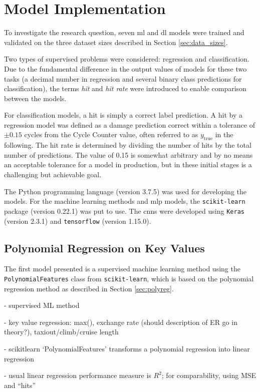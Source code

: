 \section{Model Implementation} \label{sec:practical}
To investigate the research question, seven \ac{ml} and \ac{dl} models were trained and validated on the three dataset sizes described in Section \ref{sec:data_sizes}.

Two types of supervised problems were considered: regression and classification. Due to the fundamental difference in the output values of models for these two tasks (a decimal number in regression and several binary class predictions for classification), the terms \textit{hit} and \textit{hit rate} were introduced to enable comparison between the models.

For classification models, a hit is simply a correct label prediction. A hit by a regression model was defined as a damage prediction correct within a tolerance of \(\pm0.15\) cycles from the Cycle Counter value, often referred to as \(y_\text{true}\) in the following. The hit rate is determined by dividing the number of hits by the total number of predictions. The value of 0.15 is somewhat arbitrary and by no means an acceptable tolerance for a model in production, but in these initial stages is a challenging but achievable goal.

The Python programming language (version 3.7.5) was used for developing the models. For the machine learning methods and \ac{mlp} models, the \texttt{scikit-learn} package (version 0.22.1) was put to use. The \ac{cnn}s were developed using \texttt{Keras} (version 2.3.1) and \texttt{tensorflow} (version 1.15.0).

\subsection{Polynomial Regression on Key Values}
The first model presented is a supervised machine learning method using the \texttt{PolynomialFeatures} class from \texttt{scikit-learn}, which is based on the polynomial regression method as described in Section \ref{sec:polyreg}.

- supervised ML method

- key value regression: max(), exchange rate (should description of ER go in theory?), taxiout/climb/cruise length

- scikitlearn `PolynomialFeatures' transforms a polynomial regression into linear regression

- usual linear regression performance measure is \(R^2\); for comparability, using MSE and ``hits''

